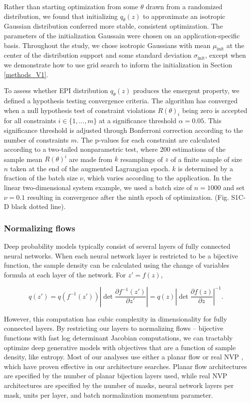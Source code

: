 \documentclass[11pt]{article}
\begin{document}
Rather than starting optimization from some $\theta$ drawn from a randomized distribution, we found that initializing $q_\theta(z)$ to approximate an isotropic Gaussian distribution conferred more stable, consistent optimization.  The parameters of the initialization Gaussain were chosen on an application-specific basis.  Throughout the study, we chose isotropic Gaussians with  mean $\mu_{\text{init}}$ at the center of the distribution support and some standard deviation $\sigma_{\text{init}}$, except when we demonstrate how to use grid search to inform the initialization in Section \ref{methods_V1}.

To assess whether EPI distribution $q_\theta(z)$ produces the emergent property, we defined a hypothesis testing convergence criteria.  
The algorithm has converged when a null hypothesis test of constraint violations $R(\theta)_i$ being zero is accepted for all constraints $i \in \{1, ..., m\}$ at a significance threshold $\alpha=0.05$.  
This significance threshold is adjusted through Bonferroni correction according to the number of constraints $m$.  
The p-values for each constraint are calculated according to a two-tailed nonparametric test, where 200 estimations of the sample mean $R(\theta)^i$ are made from $k$ resamplings of $z$ of a finite sample of size $n$ taken at the end of the augmented Lagrangian epoch.
$k$ is determined by a fraction of the batch size $\nu$, which varies according to the application.
In the linear two-dimensional system example, we used a batch size of $n = 1000$ and set $\nu = 0.1$ resulting in convergence after the ninth epoch of optimization. (Fig. S1C-D black dotted line).

\subsubsection{Normalizing flows}\label{methods_NF}
Deep probability models typically consist of several layers of fully connected neural networks.  When each neural network layer is restricted to be a bijective function, the sample density can be calculated using the change of variables formula at each layer of the network.  For $z' = f(z)$,

\begin{equation}
q(z') = q(f^{-1}(z')) \left| \det \frac{\partial f^{-1}(z')}{\partial z'} \right| = q(z) \left| \det \frac{\partial f(z)}{\partial z} \right|^{-1}.
\end{equation}

However, this computation has cubic complexity in dimensionality for fully connected layers.  By restricting our layers to normalizing flows \cite{rezende2015variational} -- bijective functions with fast log determinant Jacobian computations, we can tractably optimize deep generative models with objectives that are a function of sample density, like entropy. Most of our analyses use either a planar flow \cite{rezende2015variational} or real NVP \cite{dinh2017density}, which have proven effective in our architecture searches.  Planar flow architectures are specified by the number of planar bijection layers used, while real NVP architectures are specified by the number of masks, neural network layers per mask, units per layer, and batch normalization momentum parameter.
\end{document}
